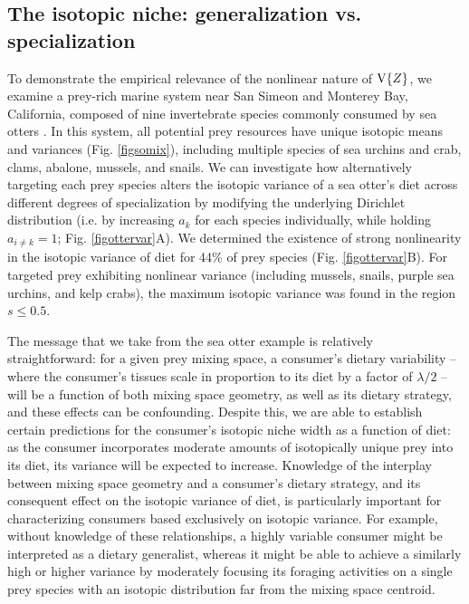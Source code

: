 \documentclass{article}
\begin{document}
\subsection*{The isotopic niche: generalization vs. specialization}



To demonstrate the empirical relevance of the nonlinear nature of ${\rm V}\{Z\}$, we examine a prey-rich marine system near San Simeon and Monterey Bay, California, composed of nine invertebrate species commonly consumed by sea otters \citep{Tinker:2008tp}.
In this system, all potential prey resources have unique isotopic means and variances (Fig. \ref{figsomix}), including multiple species of sea urchins and crab, clams, abalone, mussels, and snails.
We can investigate how alternatively targeting each prey species alters the isotopic variance of a sea otter's diet across different degrees of specialization by modifying the underlying Dirichlet distribution (i.e. by increasing $a_k$ for each species individually, while holding $a_{i \neq k} = 1$; Fig. \ref{figottervar}A).
We determined the existence of strong nonlinearity in the isotopic variance of diet for 44\% of prey species (Fig. \ref{figottervar}B). %
For targeted prey exhibiting nonlinear variance (including mussels, snails, purple sea urchins, and kelp crabs), the maximum isotopic variance was found in the region $s \leq 0.5$.

The message that we take from the sea otter example is relatively straightforward: for a given prey mixing space, a consumer's dietary variability -- where the consumer's tissues scale in proportion to its diet by a factor of $\lambda/2$ -- will be a function of both mixing space geometry, as well as its dietary strategy, and these effects can be confounding.
Despite this, we are able to establish certain predictions for the consumer's isotopic niche width as a function of diet: as the consumer incorporates moderate amounts of isotopically unique prey into its diet, its variance will be expected to increase.
Knowledge of the interplay between mixing space geometry and a consumer's dietary strategy, and its consequent effect on the isotopic variance of diet, is particularly important for characterizing consumers based exclusively on isotopic variance.
For example, without knowledge of these relationships, a highly variable consumer might be interpreted as a dietary generalist, whereas it might be able to achieve a similarly high or higher variance by moderately focusing its foraging activities on a single prey species with an isotopic distribution far from the mixing space centroid.
\end{document}
